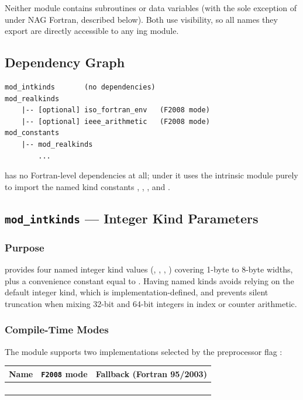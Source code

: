 Neither module contains subroutines or data variables (with the sole exception
of  under NAG Fortran, described below). Both use
 visibility, so all names they export are directly accessible to
any ing module.

\subsection{Dependency Graph}

\begin{lstlisting}
mod_intkinds       (no dependencies)
mod_realkinds
    |-- [optional] iso_fortran_env   (F2008 mode)
    |-- [optional] ieee_arithmetic   (F2008 mode)
mod_constants
    |-- mod_realkinds
        ...
\end{lstlisting}

 has no Fortran-level dependencies at all; under
 it uses the intrinsic  module purely to
import the named kind constants , , , and
.

\subsection{\texttt{mod\_intkinds} --- Integer Kind Parameters}
\label{subsec:intkinds}

\subsubsection{Purpose}

 provides four named integer kind values (,
, , ) covering 1-byte to 8-byte widths, plus
a convenience constant  equal to .
Having named kinds avoids relying on the default integer kind, which is
implementation-defined, and prevents silent truncation when mixing 32-bit
and 64-bit integers in index or counter arithmetic.

\subsubsection{Compile-Time Modes}

The module supports two implementations selected by the preprocessor flag
:

\begin{longtable}{L{3.5cm} L{5.5cm} L{5cm}}
  \toprule
  \textbf{Name} & \textbf{\texttt{F2008} mode} & \textbf{Fallback (Fortran 95/2003)} \\
  \midrule
  \endhead
  \bottomrule
  \endfoot
   &   &   \\
   &  &   \\
   &  &   \\
   &  &  \\
\end{longtable}

